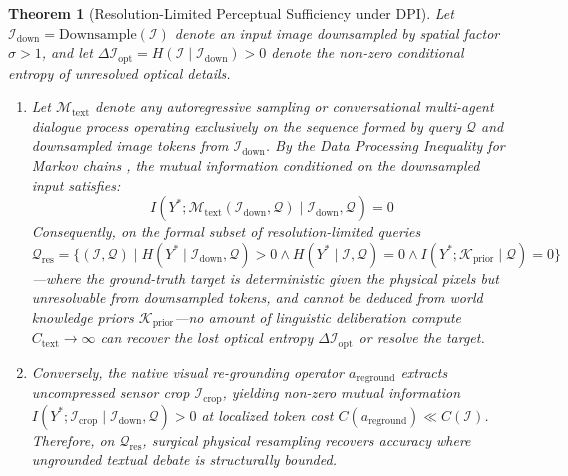 \documentclass[11pt]{article}
\newtheorem{theorem}{Theorem}
\begin{document}
\begin{theorem}[Resolution-Limited Perceptual Sufficiency under DPI]
\label{thm:dpi}
Let $\mathcal{I}_{\text{down}} = \text{Downsample}(\mathcal{I})$ denote an input image downsampled by spatial factor $\sigma > 1$, and let $\Delta \mathcal{I}_{\text{opt}} = H(\mathcal{I} \mid \mathcal{I}_{\text{down}}) > 0$ denote the non-zero conditional entropy of unresolved optical details.
\begin{enumerate}[label=(\alph*),noitemsep]
    \item Let $\mathcal{M}_{\text{text}}$ denote any autoregressive sampling or conversational multi-agent dialogue process operating exclusively on the sequence formed by query $\mathcal{Q}$ and downsampled image tokens from $\mathcal{I}_{\text{down}}$. By the Data Processing Inequality for Markov chains \citep{cover1991elements}, the mutual information conditioned on the downsampled input satisfies:
    \begin{equation}
    I(Y^*; \mathcal{M}_{\text{text}}(\mathcal{I}_{\text{down}}, \mathcal{Q}) \mid \mathcal{I}_{\text{down}}, \mathcal{Q}) = 0
    \end{equation}
    Consequently, on the formal subset of resolution-limited queries $\mathcal{Q}_{\text{res}} = \{(\mathcal{I}, \mathcal{Q}) \mid H(Y^* \mid \mathcal{I}_{\text{down}}, \mathcal{Q}) > 0 \land H(Y^* \mid \mathcal{I}, \mathcal{Q}) = 0 \land I(Y^*; \mathcal{K}_{\text{prior}} \mid \mathcal{Q}) = 0\}$---where the ground-truth target is deterministic given the physical pixels but unresolvable from downsampled tokens, and cannot be deduced from world knowledge priors $\mathcal{K}_{\text{prior}}$---no amount of linguistic deliberation compute $C_{\text{text}} \to \infty$ can recover the lost optical entropy $\Delta \mathcal{I}_{\text{opt}}$ or resolve the target.
    \item Conversely, the native visual re-grounding operator $a_{\text{reground}}$ extracts uncompressed sensor crop $\mathcal{I}_{\text{crop}}$, yielding non-zero mutual information $I(Y^*; \mathcal{I}_{\text{crop}} \mid \mathcal{I}_{\text{down}}, \mathcal{Q}) > 0$ at localized token cost $C(a_{\text{reground}}) \ll C(\mathcal{I})$. Therefore, on $\mathcal{Q}_{\text{res}}$, surgical physical resampling recovers accuracy where ungrounded textual debate is structurally bounded.
\end{enumerate}
\end{theorem}
\end{document}
